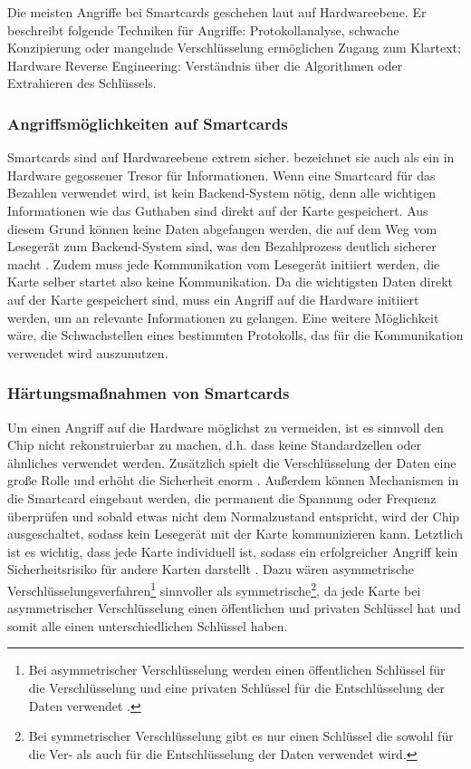 Die meisten Angriffe bei Smartcards geschehen laut \cite{refmas:ASSS} auf Hardwareebene. Er beschreibt folgende 
Techniken für Angriffe: Protokollanalyse, schwache Konzipierung oder mangelnde Verschlüsselung ermöglichen Zugang 
zum Klartext; Hardware Reverse Engineering: Verständnis über die Algorithmen oder Extrahieren des Schlüssels.


\subsubsection{Angriffsmöglichkeiten auf Smartcards}
Smartcards sind auf Hardwareebene extrem sicher. \cite{refmas:ASSS} bezeichnet sie auch als ein in Hardware gegossener
Tresor für Informationen. Wenn eine Smartcard für das Bezahlen verwendet wird, ist kein Backend-System nötig,
denn alle wichtigen Informationen wie das Guthaben sind direkt auf der Karte gespeichert. Aus diesem Grund können
keine Daten abgefangen werden, die auf dem Weg vom Lesegerät zum Backend-System sind, was den Bezahlprozess
deutlich sicherer macht \cite{refbook:WRHC}. Zudem muss jede Kommunikation vom Lesegerät initiiert werden, 
die Karte selber startet also keine Kommunikation. Da die wichtigsten Daten direkt auf der Karte gespeichert sind,
muss ein Angriff auf die Hardware initiiert werden, um an relevante Informationen zu gelangen. Eine weitere 
Möglichkeit wäre, die Schwachstellen eines bestimmten Protokolls, das für die Kommunikation verwendet wird auszunutzen.

\subsubsection{Härtungsmaßnahmen von Smartcards}
Um einen Angriff auf die Hardware möglichst zu vermeiden, ist es sinnvoll den Chip nicht rekonstruierbar zu machen, d.h. dass
keine Standardzellen oder ähnliches verwendet werden. Zusätzlich spielt die Verschlüsselung der Daten eine große Rolle und 
erhöht die Sicherheit enorm \cite{refst:ARES}. Außerdem können Mechanismen in die Smartcard eingebaut werden, die permanent 
die Spannung oder Frequenz überprüfen und sobald etwas nicht dem Normalzustand entspricht, wird der Chip ausgeschaltet, sodass 
kein Lesegerät mit der Karte kommunizieren kann. Letztlich ist es wichtig, dass jede Karte individuell ist, sodass ein 
erfolgreicher Angriff kein Sicherheitsrisiko für andere Karten darstellt \cite{refmas:ASSS}. Dazu wären asymmetrische 
Verschlüsselungsverfahren\footnote{Bei asymmetrischer Verschlüsselung werden einen öffentlichen Schlüssel für die Verschlüsselung
und eine privaten Schlüssel für die Entschlüsselung der Daten verwendet \cite{refbook:SWIS}.} sinnvoller als 
symmetrische\footnote{Bei symmetrischer Verschlüsselung gibt es nur einen Schlüssel die sowohl für die Ver- als auch
für die Entschlüsselung der Daten verwendet wird\cite{refbook:SWIS}.}, da jede Karte bei asymmetrischer Verschlüsselung einen
öffentlichen und privaten Schlüssel hat und somit alle einen unterschiedlichen Schlüssel haben.


